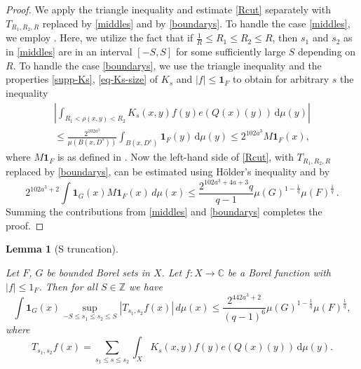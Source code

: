 \documentclass[10pt,a4paper]{article}
\theoremstyle{plain}
\newtheorem{lemma}[theorem]{Lemma}
\theoremstyle{definition}
\numberwithin{equation}{subsection}
\newcommand{\Z}{{\mathbb{Z}}}
\newcommand{\lean}[1]{}
\newcommand{\uses}[1]{}
\newcommand{\leanok}{}
\def\C{\mathbb{C}}
\begin{document}
\begin{proof}
We apply the triangle inequality and estimate \eqref{Rcut} separately with $T_{R_1,R_2,R}$ replaced by \eqref{middles} and by \eqref{boundarys}.
To handle the case \eqref{middles}, we employ . Here, we utilize the fact that if $\frac 1R\le R_1\le R_2\le R$, then $s_1$ and $s_2$ as in \eqref{middles} are in an interval $[-S,S]$ for some sufficiently large $S$ depending on $R$.
To handle the case \eqref{boundarys}, we use the triangle inequality and the properties \eqref{supp-Ks}, \eqref{eq-Ks-size} of $K_s$  and $|f| \le \mathbf{1}_F$ to obtain for arbitrary $s$ the inequality
\begin{multline}
\left|\int_{R_1 < \rho(x,y) < R_2} K_s(x,y) f(y) e(Q(x)(y)) \, \mathrm{d}\mu(y)\right|\\
\leq \frac{2^{102 a^3}}{\mu(B(x, D^{s}))}
 \int_{B(x, D^s)} \mathbf{1}_F(y) \, \mathrm{d}\mu(y)
\leq 2^{102 a^3} M\mathbf{1}_F(x),
\end{multline}
where $M\mathbf{1}_F$ is as defined in .
Now the left-hand side of \eqref{Rcut}, with $T_{R_1,R_2,R}$ replaced by \eqref{boundarys}, can be estimated using H\"older's inequality and  by
$$
    2^{102a^3+2}\int \mathbf{1}_{G}(x) M\mathbf{1}_F(x)\, d\mu(x)
    \le \frac{2^{102a^3+4a+3}q}{q-1}\mu(G)^{1-\frac{1}{q}} \mu(F)^{\frac{1}{q}}\,.
$$
Summing the contributions from \eqref{middles} and \eqref{boundarys} completes the proof.
\end{proof}

\begin{lemma}[S truncation]
    \label{S-truncation}
    \leanok
    \lean{S_truncation}
    \uses{Hardy-Littlewood, linearized-truncation}
    Let $F$, $G$ be bounded Borel sets in $X$.
    Let $f:X\to \C$ be a Borel function with $|f|\le 1_F$. Then for all $S\in\Z$ we have
    \begin{equation} \label{Scut}
        \int \mathbf{1}_G(x) \sup_{-S\le s_1\le s_2\le S} |T_{s_1,s_2} f(x)|\, d\mu(x)
        \le \frac{2^{442a^3+2}}{(q-1)^6} \mu(G)^{1-\frac{1}{q}} \mu(F)^{\frac{1}{q}},
    \end{equation}
    where
    \begin{equation}\label{Tss}
        T_{s_1,s_2} f(x) = \sum_{s_1\le s \le s_2} \int_X K_s(x,y) f(y) e(Q(x)(y)) \, \mathrm{d}\mu(y).
    \end{equation}
\end{lemma}
\end{document}
